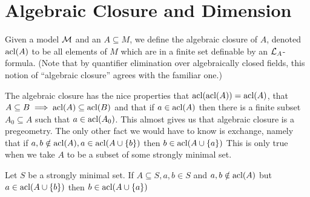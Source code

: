 \section{Algebraic Closure and Dimension}


\begin{definition}\label{definition_algebraic_closure}
Given a model \(\mathcal{M}\) and an \(A \subseteq M\), we define the algebraic closure of \(A\), denoted \(\text{acl}(A)\) to be all elements of \(M\) which are in a finite set definable by an \(\mathcal{L}_A\)-formula. 
(Note that by quantifier elimination over algebraically closed fields, this notion of ``algebraic closure'' agrees with the familiar one.)
\end{definition}

The algebraic closure has the nice properties that \(\text{acl}(\text{acl}(A)) = \text{acl}(A)\), that \(A \subseteq B \implies \text{acl}(A) \subseteq \text{acl}(B)\) and that if \(a \in \text{acl}(A)\) then there is a finite subset \(A_0 \subseteq A\) such that \(a \in \text{acl}(A_0)\).
This almost gives us that algebraic closure is a pregeometry. %
The only other fact we would have to know is exchange, namely that if \(a, b \notin \text{acl}(A), a \in \text{acl}(A \cup \{b\})\) then \(b \in \text{acl}(A \cup \{a\})\) 
This is only true when we take \(A\) to be a subset of some strongly minimal set.

\begin{theorem}\label{theorem_exchange}
Let \(S\) be a strongly minimal set. If \(A \subseteq S, a, b \in S\) and \(a, b \notin \text{acl}(A)\) but \(a \in \text{acl}(A \cup \{b\})\) then \(b \in \text{acl}(A \cup \{a\})\) 
\end{theorem}


